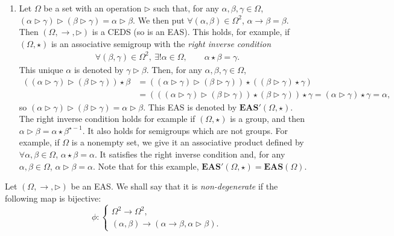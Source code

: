 \documentclass[pdftex]{sigma}
\numberwithin{equation}{section}
\newcommand{\eas}{\mathbf{EAS}}
\begin{document}
\begin{Example}
\begin{enumerate}
\item[(3)] Let $\Omega$ be a set with an operation $\triangleright$ such that, for any $\alpha,\beta,\gamma\in \Omega$,
$(\alpha \triangleright \gamma)\triangleright (\beta\triangleright \gamma)=\alpha \triangleright \beta$.
We then put
$\forall (\alpha,\beta)\in \Omega^2$, $\alpha\rightarrow \beta =\beta$.
Then $(\Omega,\rightarrow,\triangleright)$ is a CEDS (so is an EAS). This holds, for example, if $(\Omega,\star)$ is an associative semigroup with the \emph{right inverse condition}
\begin{align*}
&\forall (\beta,\gamma)\in \Omega^2, \ \exists! \alpha \in \Omega,\qquad \alpha\star \beta=\gamma.
\end{align*}
This unique $\alpha$ is denoted by $\gamma \triangleright \beta$. Then, for any $\alpha,\beta,\gamma \in \Omega$,
\begin{align*}
((\alpha \triangleright \gamma)\triangleright (\beta\triangleright \gamma))\star \beta&=((\alpha \triangleright \gamma)\triangleright (\beta\triangleright \gamma))\star ((\beta \triangleright \gamma)\star \gamma)\\
&=(((\alpha \triangleright \gamma)\triangleright (\beta\triangleright \gamma))\star (\beta \triangleright \gamma))\star \gamma
=(\alpha \triangleright \gamma)\star \gamma=\alpha,
\end{align*}
so $(\alpha \triangleright \gamma)\triangleright (\beta\triangleright \gamma)=\alpha \triangleright \beta$. This EAS is denoted by $\eas'(\Omega,\star)$.
The right inverse condition holds for example if $(\Omega,\star)$ is a group, and then
$\alpha \triangleright \beta=\alpha \star \beta^{\star-1}$.
It also holds for semigroups which are not groups. For example, if $\Omega$ is a nonempty set, we give it an associative product defined by
$\forall \alpha,\beta\in \Omega$, $ \alpha \star \beta=\alpha$.
It satisfies the right inverse condition and, for any $\alpha,\beta \in \Omega$, $\alpha \triangleright \beta=\alpha$. Note that for this example, $\eas'(\Omega,\star)=\eas(\Omega)$.
\end{enumerate}\end{Example}

\begin{Definition} \label{defi2.4}
Let $(\Omega,\rightarrow,\triangleright)$ be an EAS. We shall say that it is \emph{non-degenerate} if the following map is bijective:
\[\phi\colon \begin{cases}
\Omega^2\longrightarrow\Omega^2,\\
(\alpha,\beta)\longrightarrow(\alpha\rightarrow\beta,\alpha \triangleright\beta).
\end{cases}\]
\end{Definition}
\end{document}
